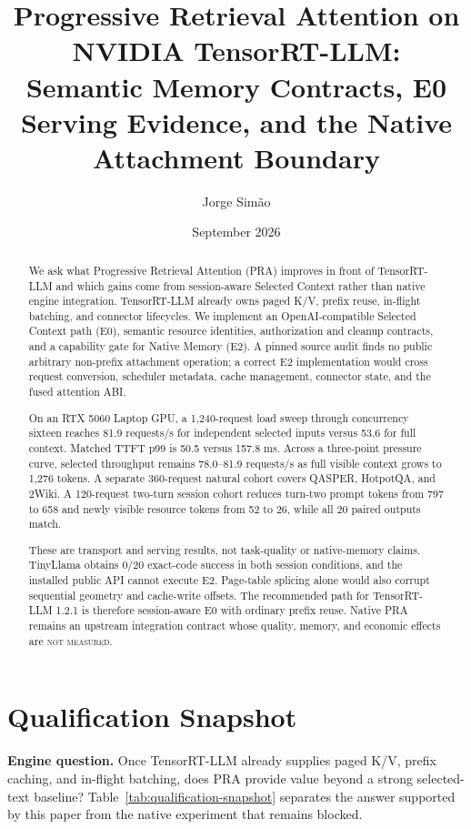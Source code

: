 \documentclass[10pt]{article}
\title{Progressive Retrieval Attention on NVIDIA TensorRT-LLM:\\
Semantic Memory Contracts, E0 Serving Evidence, and the Native Attachment Boundary}
\author{Jorge Sim\~ao}
\date{September 2026}
\begin{document}
\maketitle

\begin{abstract}
We ask what Progressive Retrieval Attention (PRA) improves in front of
TensorRT-LLM and which gains come from session-aware Selected Context rather
than native engine integration. TensorRT-LLM already owns paged K/V, prefix
reuse, in-flight batching, and connector lifecycles. We implement an
OpenAI-compatible Selected Context path (E0), semantic resource identities,
authorization and cleanup contracts, and a capability gate for Native Memory
(E2). A pinned source audit finds no public arbitrary non-prefix attachment
operation; a correct E2 implementation would cross request conversion,
scheduler metadata, cache management, connector state, and the fused attention
ABI.

On an RTX 5060 Laptop GPU, a 1,240-request load sweep through concurrency
sixteen reaches 81.9 requests/s for independent selected inputs versus 53.6
for full context. Matched TTFT p99 is 50.5 versus 157.8 ms. Across a
three-point pressure curve, selected throughput remains 78.0--81.9 requests/s
as full visible context grows to 1,276 tokens. A separate 360-request natural
cohort covers QASPER, HotpotQA, and 2Wiki. A 120-request two-turn session
cohort reduces turn-two prompt tokens from 797 to 658 and newly visible
resource tokens from 52 to 26, while all 20 paired outputs match.

These are transport and serving results, not task-quality or native-memory
claims. TinyLlama obtains 0/20 exact-code success in both session conditions,
and the installed public API cannot execute E2. Page-table splicing alone would
also corrupt sequential geometry and cache-write offsets. The recommended path
for TensorRT-LLM 1.2.1 is therefore session-aware E0 with ordinary prefix
reuse. Native PRA remains an upstream integration contract whose quality,
memory, and economic effects are \textsc{not measured}.
\end{abstract}

\section{Qualification Snapshot}
\textbf{Engine question.} Once TensorRT-LLM already supplies paged K/V,
prefix caching, and in-flight batching, does PRA provide value beyond a strong
selected-text baseline? Table~\ref{tab:qualification-snapshot} separates the
answer supported by this paper from the native experiment that remains
blocked.
\end{document}
